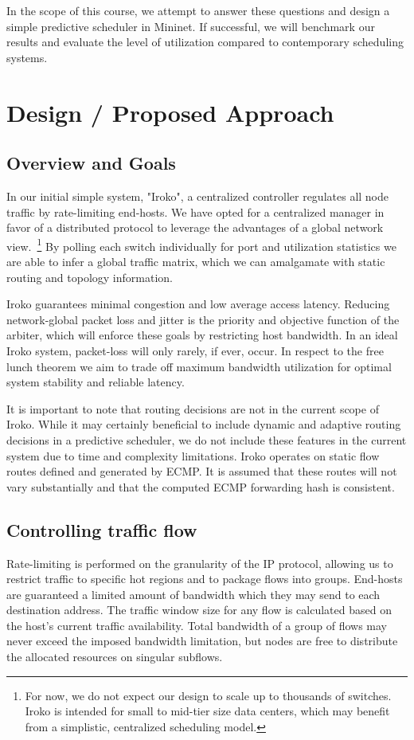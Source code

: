 \documentclass[sigconf]{acmart}
\begin{document}
In the scope of this course, we attempt to answer these questions and design a simple predictive scheduler in Mininet. If successful, we will benchmark our results and evaluate the level of utilization compared to contemporary scheduling systems.

\section{Design / Proposed Approach}
\label{sec:design}

\subsection{Overview and Goals}
In our initial simple system, "Iroko", a centralized controller regulates all node traffic by rate-limiting end-hosts. We have opted for a centralized manager in favor of a distributed protocol to leverage the advantages of a global network view.~\footnote{For now, we do not expect our design to scale up to thousands of switches. Iroko is intended for small to mid-tier size data centers, which may benefit from a simplistic, centralized scheduling model.}
By polling each switch individually for port and utilization statistics we are able to infer a global traffic matrix, which we can amalgamate with static routing and topology information. 

Iroko guarantees minimal congestion and low average access latency. Reducing network-global packet loss and jitter is the priority and objective function of the arbiter, which will enforce these goals by restricting host bandwidth. In an ideal Iroko system, packet-loss will only rarely, if ever, occur. In respect to the free lunch theorem we aim to trade off maximum bandwidth utilization for optimal system stability and reliable latency.

It is important to note that routing decisions are not in the current scope of Iroko. While it may certainly beneficial to include dynamic and adaptive routing decisions in a predictive scheduler, we do not include these features in the current system due to time and complexity limitations. Iroko operates on static flow routes defined and generated by ECMP. It is assumed that these routes will not vary substantially and that the computed ECMP forwarding hash is consistent.


\subsection{Controlling traffic flow}
Rate-limiting is performed on the granularity of the IP protocol, allowing us to restrict traffic to specific hot regions and to package flows into groups.
End-hosts are guaranteed a limited amount of bandwidth which they may send to each destination address. The traffic window size for any flow is calculated based on the host's current traffic availability. Total bandwidth of a group of flows may never exceed the imposed bandwidth limitation, but nodes are free to distribute the allocated resources on singular subflows.
\end{document}
